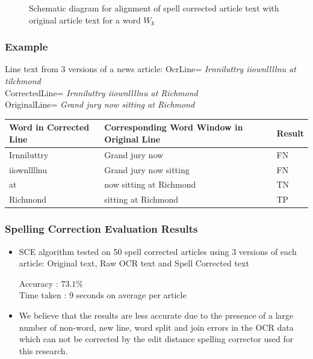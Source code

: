 \documentclass{beamer}
\begin{document}
\begin{frame}
\begin{columns}
\end{columns}
\begin{figure}
\caption{Schematic diagram for alignment of spell corrected article text with original article text for a word $W_{k}$}
\end{figure}
\end{frame}



\begin{frame}
\frametitle{Example}

\begin{block}{Line text from 3 versions of a news article:}
OcrLine= \textit{Irnniluttry iiownllllnu at tilchmond}\\

CorrectedLine= \textit{Irnniluttry iiownllllnu at Richmond}\\

OriginalLine= \textit{Grand jury now sitting at Richmond} 
\end{block}

\begin{table}[bt]
\begin{tabular}{|p{2.5cm}|p{4.5cm}|p{2cm}|} \hline
\textbf{Word in Corrected Line} & \textbf{Corresponding Word Window in Original Line}& \textbf{Result} \\ \hline
Irnniluttry & Grand jury now & FN \\ \hline
iiownllllnu & Grand jury now sitting & FN \\ \hline
at & now sitting at Richmond & TN \\ \hline
Richmond  &  sitting at Richmond & TP \\ \hline
\end{tabular}
\end{table}
\end{frame}

\begin{frame}
\frametitle{Spelling Correction Evaluation Results}
\begin{itemize}

 \justifying
\item
SCE algorithm tested on 50 spell corrected articles using 3 versions of each article: Original text, Raw OCR text and Spell Corrected text

\begin{block}{}
Accuracy :  $73.1 \%$\\
Time taken : 9 seconds on average per article
\end{block}


\item
We believe that the results are less accurate due to the presence of a large number of non-word, new line, word split and join errors in the OCR data which can not
be corrected by the edit distance spelling corrector used for this research.
\end{itemize}
\end{frame}
\end{document}
